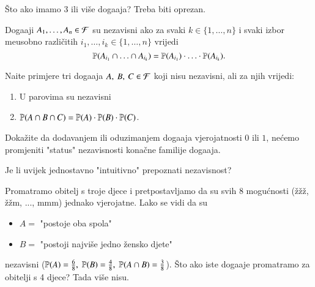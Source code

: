 \v Sto ako imamo 3 ili vi\v se doga\dj aja?
Treba biti oprezan.

\begin{defn}    \label{defn:6.3-1}
    Doga\dj aji $A_1, \ldots, A_n \in \mathcal{F}$ su nezavisni ako za svaki $k \in \{1, \ldots, n\}$ i svaki izbor me\dj usobno razli\v citih $i_1, \ldots, i_k \in \{1, \ldots, n\}$ vrijedi
    \begin{equation*}
        \mathbb{P}({A_{i_1} \cap \ldots  \cap A_{i_k}}) = \mathbb{P}({A_{i_1}}) \cdot \ldots \cdot \mathbb{P}({A_{i_k}}).
    \end{equation*}    
\end{defn}

\begin{zad} \label{zad:6.4}
    Na\dj ite primjere tri doga\dj aja $A, \: B, \: C \in \mathcal{F}$ koji nisu nezavisni, ali za njih vrijedi:
    \begin{enumerate}[label=(\roman*)]
        \item U parovima su nezavisni
        \item $\mathbb{P}({A \cap B \cap C}) = \mathbb{P}({A}) \cdot \mathbb{P}({B}) \cdot \mathbb{P}({C})$.
    \end{enumerate}
\end{zad}

\begin{zad} \label{zad:6.5}
    Doka\v zite da dodavanjem ili oduzimanjem doga\dj aja vjerojatnosti $0$ ili $1$, ne\' cemo promjeniti "status" nezavisnosti kona\v cne familije doga\dj aja.
\end{zad}

Je li uvijek jednostavno "intuitivno" prepoznati nezavisnost?

\begin{pr}  \label{pr:6.6}
    Promatramo obitelj s troje djece i pretpostavljamo da su svih 8 mogu\' cnosti (\v z\v z\v z, \v z\v zm, ..., mmm) jednako vjerojatne.
    Lako se vidi da su
    \begin{itemize}
        \item[] $A =$ "postoje oba spola"
        \item[] $B = $ "postoji najvi\v se jedno \v zensko djete"
    \end{itemize}
    nezavisni ($\mathbb{P}({A}) = \frac{6}{8}, \; \mathbb{P}({B}) = \frac{4}{8}, \; \mathbb{P}({A \cap B}) = \frac{3}{8}$).
    \v Sto ako iste doga\dj aje promatramo za obitelji s 4 djece? Tada vi\v se nisu.
\end{pr}


